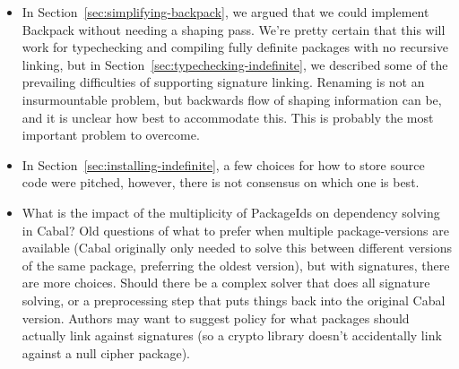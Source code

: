 \documentclass{article}
\begin{document}
\begin{itemize}

    \item In Section~\ref{sec:simplifying-backpack}, we argued that we
        could implement Backpack without needing a shaping pass. We're
        pretty certain that this will work for typechecking and
        compiling fully definite packages with no recursive linking, but
        in Section~\ref{sec:typechecking-indefinite}, we described some
        of the prevailing difficulties of supporting signature linking.
        Renaming is not an insurmountable problem, but backwards flow of
        shaping information can be, and it is unclear how best to
        accommodate this.  This is probably the most important problem
        to overcome.

    \item In Section~\ref{sec:installing-indefinite}, a few choices for how to
        store source code were pitched, however, there is not consensus on which
        one is best.

    \item What is the impact of the multiplicity of PackageIds on
        dependency solving in Cabal?  Old questions of what to prefer
        when multiple package-versions are available (Cabal originally
        only needed to solve this between different versions of the same
        package, preferring the oldest version), but with signatures,
        there are more choices.  Should there be a complex solver that
        does all signature solving, or a preprocessing step that puts
        things back into the original Cabal version.  Authors may want
        to suggest policy for what packages should actually link against
        signatures (so a crypto library doesn't accidentally link
        against a null cipher package).

\end{itemize}
\end{document}
